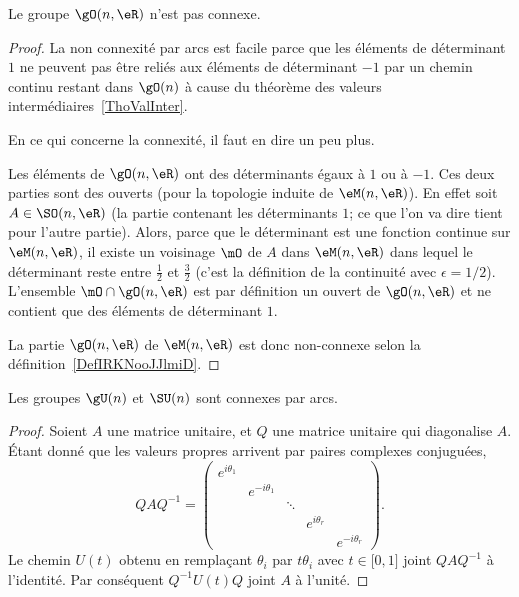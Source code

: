 \begin{lemma}           \label{LEMooIPOVooZJyNoH}
	Le groupe \( \gO(n,\eR)\) n'est pas connexe.
\end{lemma}

\begin{proof}
	La non connexité par arcs est facile parce que les éléments de déterminant \( 1\) ne peuvent pas être reliés aux éléments de déterminant \( -1\) par un chemin continu restant dans \( \gO(n)\) à cause du théorème des valeurs intermédiaires~\ref{ThoValInter}.

	En ce qui concerne la connexité, il faut en dire un peu plus.

	Les éléments de \( \gO(n,\eR)\) ont des déterminants égaux à \( 1\) ou à \( -1\). Ces deux parties sont des ouverts (pour la topologie induite de \( \eM(n,\eR)\)). En effet soit \( A\in\SO(n,\eR)\) (la partie contenant les déterminants \( 1\); ce que l'on va dire tient pour l'autre partie). Alors, parce que le déterminant est une fonction continue sur \( \eM(n,\eR)\), il existe un voisinage \( \mO\) de \( A\) dans \( \eM(n,\eR)\) dans lequel le déterminant reste entre \( \frac{ 1 }{2}\) et \( \frac{ 3 }{2}\) (c'est la définition de la continuité avec \( \epsilon=1/2\)). L'ensemble \( \mO\cap\gO(n,\eR)\) est par définition un ouvert de \( \gO(n,\eR)\) et ne contient que des éléments de déterminant \( 1\).

	La partie \( \gO(n,\eR)\) de \( \eM(n,\eR)\) est donc non-connexe selon la définition~\ref{DefIRKNooJJlmiD}.
\end{proof}

\begin{lemma}       \label{LEMooQMXHooZQozMK}
	Les groupes \( \gU(n)\) et \( \SU(n)\) sont connexes par arcs.
\end{lemma}

\begin{proof}
	Soient \( A\) une matrice unitaire, et \( Q\) une matrice unitaire qui diagonalise \( A\). Étant donné que les valeurs propres arrivent par paires complexes conjuguées,
	\begin{equation}
		QAQ^{-1}=\begin{pmatrix}
			e^{i\theta_1} &                &        &               &                \\
			              & e^{-i\theta_1} &        &               &                \\
			              &                & \ddots &               &                \\
			              &                &        & e^{i\theta_r} &                \\
			              &                &        &               & e^{-i\theta_r}
		\end{pmatrix}.
	\end{equation}
	Le chemin \( U(t)\) obtenu en remplaçant \( \theta_i\) par \( t\theta_i\) avec \( t\in\mathopen[ 0 , 1 \mathclose]\) joint \( QAQ^{-1}\) à l'identité. Par conséquent \( Q^{-1}U(t)Q\) joint \( A\) à l'unité.
\end{proof}


